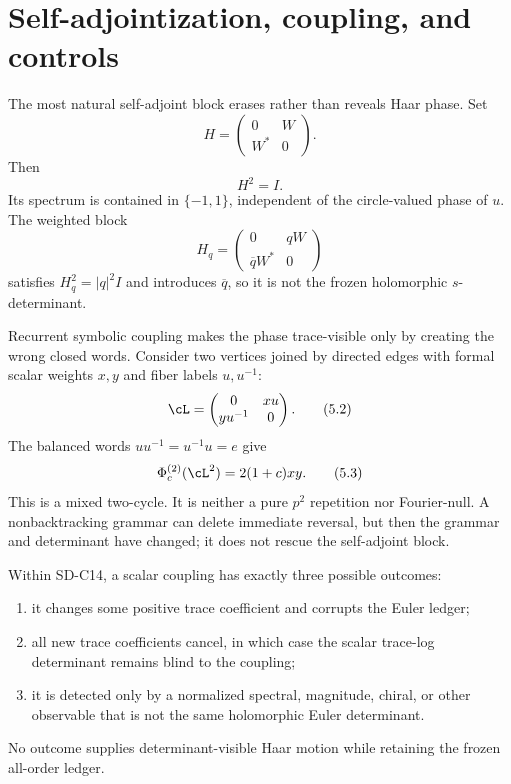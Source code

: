 \section{Self-adjointization, coupling, and controls}
\label{sec:controls}

The most natural self-adjoint block erases rather than reveals Haar phase.
Set
\[
 H=\begin{pmatrix}0&W\\W^*&0\end{pmatrix}.
\]
Then
\[
 H^2=I.                                                    \tag{5.1}
\]
Its spectrum is contained in $\{-1,1\}$, independent of the circle-valued
phase of $u$.  The weighted block
\[
 H_q=\begin{pmatrix}0&qW\\\overline qW^*&0\end{pmatrix}
\]
satisfies $H_q^2=|q|^2I$ and introduces $\overline q$, so it is not the frozen
holomorphic $s$-determinant.

Recurrent symbolic coupling makes the phase trace-visible only by creating
the wrong closed words.  Consider two vertices joined by directed edges with
formal scalar weights $x,y$ and fiber labels $u,u^{-1}$:
\[
 \cL=\begin{pmatrix}0&xu\\yu^{-1}&0\end{pmatrix}.         \tag{5.2}
\]
The balanced words $uu^{-1}=u^{-1}u=e$ give
\[
 \Phi_c^{(2)}(\cL^2)=2(1+c)xy.                             \tag{5.3}
\]
This is a mixed two-cycle.  It is neither a pure $p^2$ repetition nor
Fourier-null.  A nonbacktracking grammar can delete immediate reversal, but
then the grammar and determinant have changed; it does not rescue the
self-adjoint block.

\begin{theorem}
\label{thm:trilemma}
Within SD-C14, a scalar coupling has exactly three possible outcomes:
\begin{enumerate}
 \item it changes some positive trace coefficient and corrupts the Euler
       ledger;
 \item all new trace coefficients cancel, in which case the scalar
       trace-log determinant remains blind to the coupling;
 \item it is detected only by a normalized spectral, magnitude, chiral, or
       other observable that is not the same holomorphic Euler determinant.
\end{enumerate}
No outcome supplies determinant-visible Haar motion while retaining the
frozen all-order ledger.
\end{theorem}

